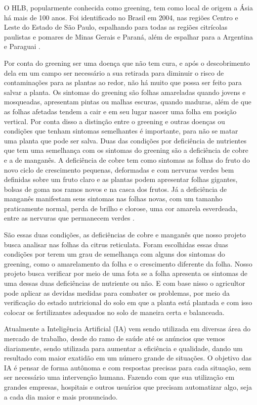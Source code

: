 O HLB, popularmente conhecida como greening, tem como local de origem a Ásia há mais de 100 anos. Foi identificado no Brasil em 2004, nas regiões Centro e Leste do Estado de São Paulo, espalhando para todas as regiões citrícolas paulistas e pomares de Minas Gerais e Paraná, além de espalhar para a Argentina e Paraguai \cite{IntroduçãoGreening}.  

Por conta do greening ser uma doença que não tem cura, e após o descobrimento dela em um campo ser necessário a sua retirada para diminuir o risco de contaminações para as plantas ao redor, não há muito que possa ser feito para salvar a planta. Os sintomas do greening são folhas amareladas quando jovens e mosqueadas, apresentam pintas ou malhas escuras, quando maduras, além de que as folhas afetadas tendem a cair e em seu lugar nascer uma folha em posição vertical. Por conta disso a distinção entre o greening e outras doenças ou condições que tenham sintomas semelhantes é importante, para não se matar uma planta que pode ser salva. Duas das condições por deficiência de nutrientes que tem uma semelhança com os sintomas do greening são a deficiência de cobre e a de manganês. A deficiência de cobre tem como sintomas as folhas do fruto do novo ciclo de crescimento pequenas, deformadas e com nervuras verdes bem definidas sobre um fruto claro e as plantas podem apresentar folhas gigantes, bolsas de goma nos ramos novos e na casca dos frutos. Já a deficiência de manganês manifestam seus sintomas nas folhas novas, com um tamanho praticamente normal, perda de brilho e clorose, uma cor amarela esverdeada, entre as nervuras que permanecem verdes \cite{IntroduçãoGreening, IntroduçãoDeficiencias}.

São essas duas condições, as deficiências de cobre e manganês que nosso projeto busca analisar nas folhas da citrus reticulata. Foram escolhidas essas duas condições por terem um grau de semelhança com alguns dos sintomas do greening, como o amarelamento da folha e o crescimento diferente da folha. Nosso projeto busca verificar por meio de uma fota se a folha apresenta os sintomas de uma dessas duas deficiências de nutriente ou não. E com base nisso o agricultor pode aplicar as devidas medidas para combater os problemas, por meio da verificação do estado nutricional do solo em que a planta está plantada e com isso colocar os fertilizantes adequados no solo de maneira certa e balanceada.

Atualmente a Inteligência Artificial (IA) vem sendo utilizada em diversas área do mercado de trabalho, desde do ramo de saúde até os anúncios que vemos diariamente, sendo utilizada para aumentar a eficiência e qualidade, dando um resultado com maior exatidão em um número grande de situações. O objetivo das IA é pensar de forma autônoma e com respostas precisas para cada situação, sem ser necessário uma intervenção humana. Fazendo com que sua utilização em grandes empresas, hospitais e outros usuários que precisam automatizar algo, seja a cada dia maior e mais pronunciado.


